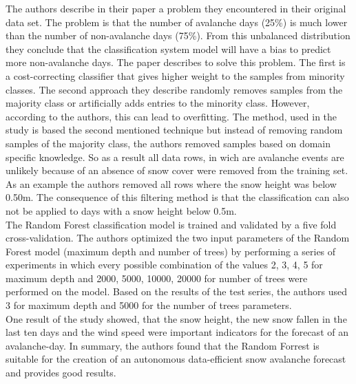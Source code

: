 \documentclass[../masterarbeit.tex]{subfiles}
\begin{document}
The authors describe in their paper a problem they encountered in their original data set. The problem is that the number of avalanche days (25\%) is much lower than the number of non-avalanche days (75\%). From this unbalanced distribution they conclude that the classification system model will have a bias to predict more non-avalanche days. The paper describes to solve this problem. The first is a cost-correcting classifier that gives higher weight to the samples from minority classes. The second approach they describe randomly removes samples from the majority class or artificially adds entries to the minority class. However, according to the authors, this can lead to overfitting. The method, used in the study is based the second mentioned technique but instead of removing random samples of the majority class, the authors removed samples based on domain specific knowledge. So as a result all data rows, in wich are avalanche events are unlikely because of an absence of snow cover were removed from the training set. As an example the authors removed all rows where the snow height was below 0.50m. The consequence of this filtering method is that the classification can also not be applied to days with a snow height below 0.5m. \autocite[]{nhess-2021-106} \\
The Random Forest classification model is trained and validated by a five fold cross-validation. The authors optimized the two input parameters of the Random Forest model (maximum depth and number of trees) by performing a series of experiments in which every possible combination of the values 2, 3, 4, 5 for maximum depth and 2000, 5000, 10000, 20000 for number of trees were performed on the model. Based on the results of the test series, the authors used 3 for maximum depth and 5000 for the number of trees parameters. \autocite[]{nhess-2021-106} \\
One result of the study showed, that the snow height, the new snow fallen in the last ten days and the wind speed were important indicators for the forecast of an avalanche-day. In summary, the authors found that the Random Forrest is suitable for the creation of an autonomous data-efficient snow avalanche forecast and provides good results. \autocite[]{nhess-2021-106} \\
\end{document}
